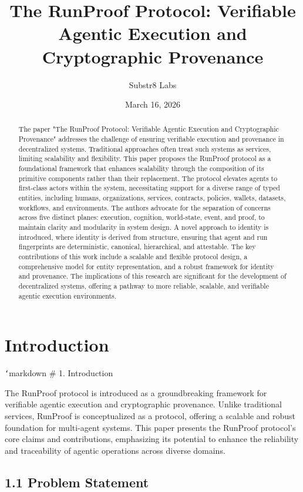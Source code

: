 \documentclass[11pt]{article}
\title{The RunProof Protocol: Verifiable Agentic Execution and Cryptographic Provenance}
\author{Substr8 Labs}
\date{March 16, 2026}
\begin{document}
\maketitle

\begin{abstract}
The paper "The RunProof Protocol: Verifiable Agentic Execution and Cryptographic Provenance" addresses the challenge of ensuring verifiable execution and provenance in decentralized systems. Traditional approaches often treat such systems as services, limiting scalability and flexibility. This paper proposes the RunProof protocol as a foundational framework that enhances scalability through the composition of its primitive components rather than their replacement. The protocol elevates agents to first-class actors within the system, necessitating support for a diverse range of typed entities, including humans, organizations, services, contracts, policies, wallets, datasets, workflows, and environments. The authors advocate for the separation of concerns across five distinct planes: execution, cognition, world-state, event, and proof, to maintain clarity and modularity in system design. A novel approach to identity is introduced, where identity is derived from structure, ensuring that agent and run fingerprints are deterministic, canonical, hierarchical, and attestable. The key contributions of this work include a scalable and flexible protocol design, a comprehensive model for entity representation, and a robust framework for identity and provenance. The implications of this research are significant for the development of decentralized systems, offering a pathway to more reliable, scalable, and verifiable agentic execution environments.
\end{abstract}

\section{Introduction}
\texttt{`}markdown
\# 1. Introduction

The RunProof protocol is introduced as a groundbreaking framework for verifiable agentic execution and cryptographic provenance. Unlike traditional services, RunProof is conceptualized as a protocol, offering a scalable and robust foundation for multi-agent systems. This paper presents the RunProof protocol's core claims and contributions, emphasizing its potential to enhance the reliability and traceability of agentic operations across diverse domains.

\subsection{1.1 Problem Statement}
\end{document}
